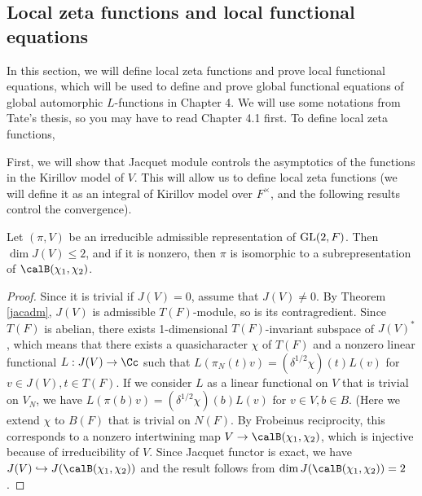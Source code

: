 \subsection{Local zeta functions and local functional equations}
In this section, we will define local zeta functions and prove local functional equations, which will be used to define and prove global functional equations of global automorphic $L$-functions in Chapter 4. 
We will use some notations from Tate's thesis, so you may have to read Chapter 4.1 first. 
To define local zeta functions, 


First, we will show that Jacquet module controls the asymptotics of the functions in the Kirillov model of $V$. 
This will allow us to define local zeta functions (we will define it as an integral of Kirillov model over $F^{\times}$, and the following results control the convergence).

\begin{proposition}
\label{jacdim2}
Let $(\pi, V)$ be an irreducible admissible representation of $\mathrm{GL}(2, F)$. Then $\dim J(V) \leq 2$, and if it is nonzero, then $\pi$ is isomorphic to a subrepresentation of $\calB(\chi_1, \chi_2)$. 
\end{proposition}
\begin{proof}
Since it is trivial if $J(V) = 0$, assume that $J(V) \neq 0$. 
By Theorem \ref{jacadm}, $J(V)$ is admissible $T(F)$-module, so is its contragredient. 
Since $T(F)$ is abelian, there exists 1-dimensional $T(F)$-invariant subspace of $J(V)^{*}$, which means that there exists a quasicharacter $\chi$ of $T(F)$ and a nonzero linear functional $L:J(V)\to \Cc$ such that $L(\pi_{N}(t)v) = (\delta^{1/2}\chi)(t)L(v)$ for $v\in J(V), t\in T(F)$. 
If we consider $L$ as a linear functional on $V$ that is trivial on $V_N$, we have $L(\pi(b)v) = (\delta^{1/2}\chi)(b)L(v)$ for $v\in V, b\in B$. (Here we extend $\chi$ to $B(F)$ that is trivial on $N(F)$. 
By Frobeinus reciprocity, this corresponds to a nonzero intertwining map $V \to \calB(\chi_1, \chi_2)$, which is injective because of irreducibility of $V$. 
Since Jacquet functor is exact, we have $J(V)\hookrightarrow J(\calB(\chi_1, \chi_2))$ and the result follows from $\dim J(\calB(\chi_1, \chi_2)) = 2$. 
\end{proof}

